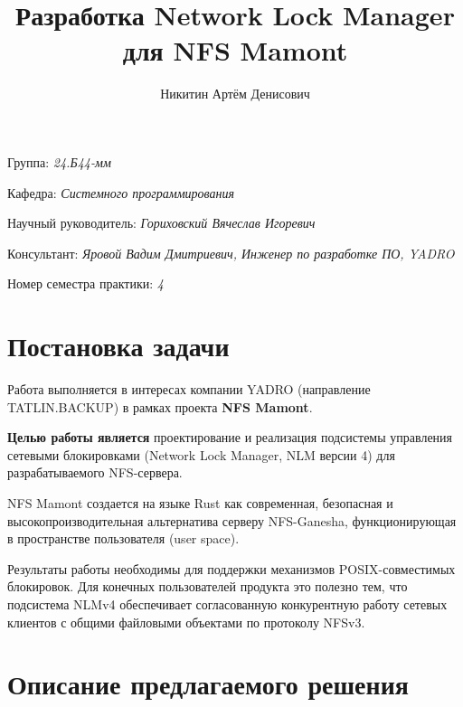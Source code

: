 \documentclass[a4paper]{article}
\title{Разработка Network Lock Manager для NFS Mamont}
\author{Никитин Артём Денисович}
\date{}
\begin{document}
\maketitle

\begin{flushright}
    Группа: \emph{24.Б44-мм}

    Кафедра: \emph{Системного программирования}

    Научный руководитель: \emph{Гориховский Вячеслав Игоревич}

    Консультант: \emph{Яровой Вадим Дмитриевич, Инженер по разработке ПО, YADRO}
    
    Номер семестра практики: \emph{4}
\end{flushright} 

\section{Постановка задачи}

Работа выполняется в интересах компании YADRO (направление TATLIN.BACKUP) в рамках проекта \textbf{NFS Mamont}.

\textbf{Целью работы является} проектирование и реализация подсистемы управления сетевыми блокировками (Network Lock Manager, NLM версии 4) для разрабатываемого NFS-сервера.

NFS Mamont создается на языке Rust как современная, безопасная и высокопроизводительная альтернатива серверу NFS-Ganesha, функционирующая в пространстве пользователя (user space).

Результаты работы необходимы для поддержки механизмов POSIX-совместимых блокировок. Для конечных пользователей продукта это полезно тем, что подсистема NLMv4 обеспечивает согласованную конкурентную работу сетевых клиентов с общими файловыми объектами по протоколу NFSv3.

\section{Описание предлагаемого решения}
\end{document}
